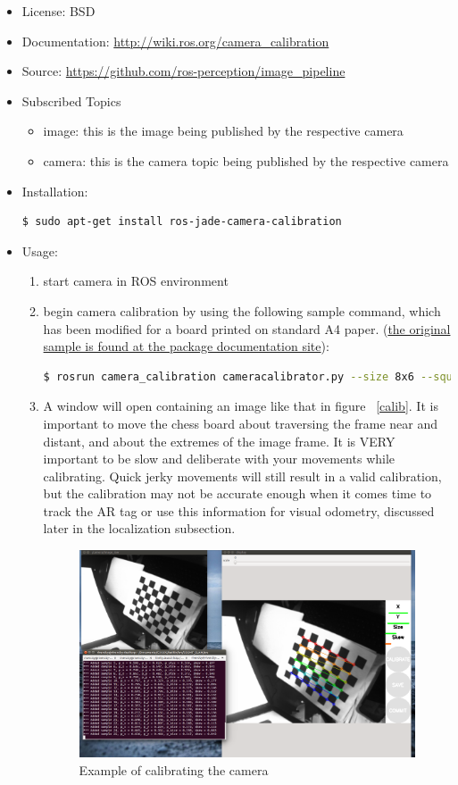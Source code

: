 \begin{itemize}
\item License: BSD
\item Documentation: \url{http://wiki.ros.org/camera_calibration}
\item Source: \url{https://github.com/ros-perception/image_pipeline}
\item Subscribed Topics
\begin{itemize}
\item image: this is the image being published by the respective camera 
\item camera: this is the camera topic being published by the respective camera
\end{itemize}
\item Installation:
\begin{lstlisting}[language=bash]
$ sudo apt-get install ros-jade-camera-calibration
\end{lstlisting}
\item Usage:
\begin{enumerate}
\item start camera in ROS environment
\item begin camera calibration by using the following sample command, which has been modified for a board printed on standard A4 paper. (\href{http://wiki.ros.org/camera_calibration}{the original sample is found at the package documentation site}):
\begin{lstlisting}[language=bash]
$ rosrun camera_calibration cameracalibrator.py --size 8x6 --square 0.0254 image:=/camera/raw_image camera:=/camera
\end{lstlisting}
\item A window will open containing an image like that in figure ~\ref{calib}. It is important to move the chess board about traversing the frame near and distant, and about the extremes of the image frame. It is VERY important to be slow and deliberate with your movements while calibrating. Quick jerky movements will still result in a valid calibration, but the calibration may not be accurate enough when it comes time to track the AR tag or use this information for visual odometry, discussed later in the localization subsection.\\
\begin{figure}[h]
\caption{Example of calibrating the camera}
\centering
\includegraphics[width=.75\textwidth]{images/calibration}

\end{figure}
\end{enumerate}
\end{itemize}
